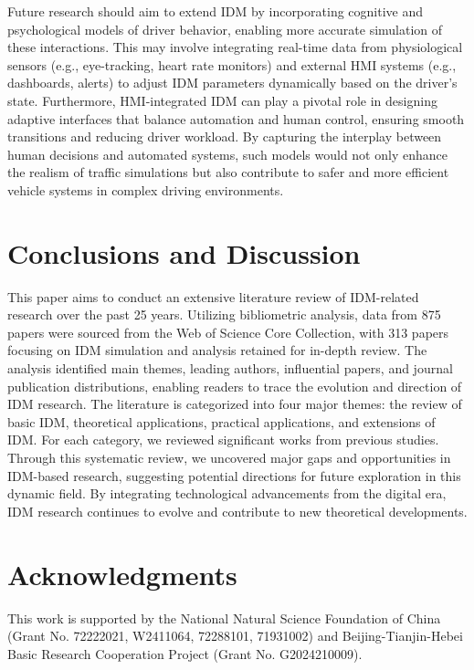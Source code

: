 \documentclass[a4paper,fleqn]{cas-sc}
\begin{document}
Future research should aim to extend IDM by incorporating cognitive and psychological models of driver behavior, enabling more accurate simulation of these interactions. This may involve integrating real-time data from physiological sensors (e.g., eye-tracking, heart rate monitors) and external HMI systems (e.g., dashboards, alerts) to adjust IDM parameters dynamically based on the driver's state. Furthermore, HMI-integrated IDM can play a pivotal role in designing adaptive interfaces that balance automation and human control, ensuring smooth transitions and reducing driver workload. By capturing the interplay between human decisions and automated systems, such models would not only enhance the realism of traffic simulations but also contribute to safer and more efficient vehicle systems in complex driving environments.

\section{Conclusions and Discussion}

This paper aims to conduct an extensive literature review of IDM-related research over the past 25 years. Utilizing bibliometric analysis, data from 875 papers were sourced from the Web of Science Core Collection, with 313 papers focusing on IDM simulation and analysis retained for in-depth review. The analysis identified main themes, leading authors, influential papers, and journal publication distributions, enabling readers to trace the evolution and direction of IDM research. The literature is categorized into four major themes: the review of basic IDM, theoretical applications, practical applications, and extensions of IDM. For each category, we reviewed significant works from previous studies. Through this systematic review, we uncovered major gaps and opportunities in IDM-based research, suggesting potential directions for future exploration in this dynamic field. By integrating technological advancements from the digital era, IDM research continues to evolve and contribute to new theoretical developments.



\section{Acknowledgments}
This work is supported by the National Natural Science Foundation of China (Grant No. 72222021, W2411064, 72288101, 71931002) and Beijing-Tianjin-Hebei Basic Research Cooperation Project (Grant No. G2024210009). 
\end{document}
